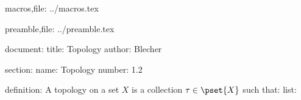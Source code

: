 

macros,file:
    ../macros.tex

preamble,file:
    ../preamble.tex

document:
    title:
        Topology
    author:
        Blecher
    
    section:
        name:
            Topology
        number:
            1.2
    
    definition:
    A topology on a set $X$ is a collection $\tau \in \pset{X}$ such that:
        list:
            
        
        
        



